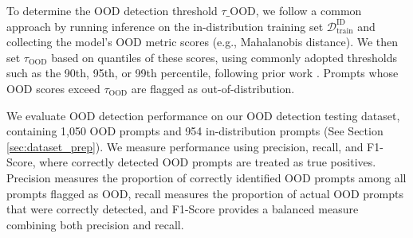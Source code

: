 To determine the OOD detection threshold $\tau\_{\text{OOD}}$, we follow a common approach by running inference on the in-distribution training set $\mathcal{D}_{\text{train}}^{\text{ID}}$ and collecting the model's OOD metric scores (e.g., Mahalanobis distance).
We then set $\tau_{\text{OOD}}$ based on quantiles of these scores, using commonly adopted thresholds such as the 90th, 95th, or 99th percentile, following prior work \cite{liu2020energy}.
Prompts whose OOD scores exceed $\tau_{\text{OOD}}$ are flagged as out-of-distribution.

We evaluate OOD detection performance on our OOD detection testing dataset, containing 1,050 OOD prompts and 954 in-distribution prompts (See Section \ref{sec:dataset_prep}).
We measure performance using precision, recall, and F1-Score, where correctly detected OOD prompts are treated as true positives. Precision measures the proportion of correctly identified OOD prompts among all prompts flagged as OOD, recall measures the proportion of actual OOD prompts that were correctly detected, and F1-Score provides a balanced measure combining both precision and recall.


